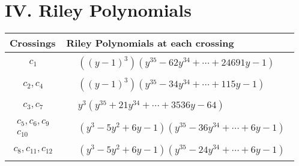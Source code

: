 \documentclass[1p]{elsarticle_modified}
\theoremstyle{definition}
\begin{document}
\centering \section*{ IV. Riley Polynomials}
\begin{tabular}{m{50pt}|m{274pt}}
Crossings & \hspace{64pt}Riley Polynomials at each crossing \\
\hline $$\begin{aligned}c_{1}\end{aligned}$$&$\begin{aligned}
&((y-1)^3)(y^{35}-62 y^{34}+\cdots+24691 y-1)
\end{aligned}$\\
\hline $$\begin{aligned}c_{2},c_{4}\end{aligned}$$&$\begin{aligned}
&((y-1)^3)(y^{35}-34 y^{34}+\cdots+115 y-1)
\end{aligned}$\\
\hline $$\begin{aligned}c_{3},c_{7}\end{aligned}$$&$\begin{aligned}
&y^3(y^{35}+21 y^{34}+\cdots+3536 y-64)
\end{aligned}$\\
\hline $$\begin{aligned}c_{5},c_{6},c_{9}\\c_{10}\end{aligned}$$&$\begin{aligned}
&(y^3-5 y^2+6 y-1)(y^{35}-36 y^{34}+\cdots+6 y-1)
\end{aligned}$\\
\hline $$\begin{aligned}c_{8},c_{11},c_{12}\end{aligned}$$&$\begin{aligned}
&(y^3-5 y^2+6 y-1)(y^{35}-24 y^{34}+\cdots+6 y-1)
\end{aligned}$\\
\hline
\end{tabular}
\vskip 2pc
\end{document}
